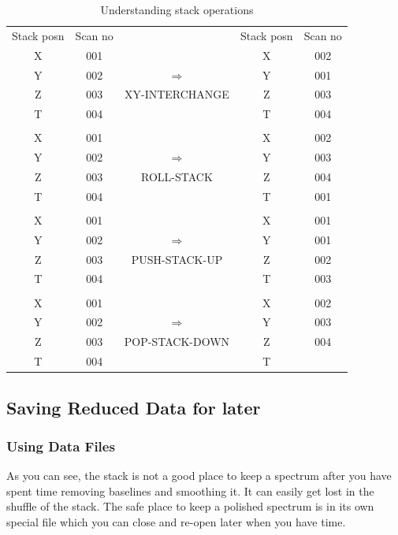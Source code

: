 \documentclass[11pt,twoside]{article}
\begin{document}
\begin{table}[htb]
\caption{Understanding stack operations}
\begin{center}
\begin{tabular}{ccccc}
Stack posn & Scan no &      & Stack posn & Scan no \\ 
X & 001 &                                & X & 002 \\ 
Y & 002 & {\huge $\Longrightarrow$}      & Y & 001 \\
Z & 003 & {\footnotesize XY-INTERCHANGE} & Z & 003 \\
T & 004 &                                & T & 004 \\
  &     &                                &   &     \\
X & 001 &                                & X & 002 \\ 
Y & 002 & {\huge $\Longrightarrow$}      & Y & 003 \\
Z & 003 & {\footnotesize ROLL-STACK}     & Z & 004 \\
T & 004 &                                & T & 001 \\
  &     &                                &   &     \\
X & 001 &                                & X & 001 \\
Y & 002 & {\huge $\Longrightarrow$}      & Y & 001 \\
Z & 003 & {\footnotesize PUSH-STACK-UP}  & Z & 002 \\
T & 004 &                                & T & 003 \\
  &     &                                &   &     \\
X & 001 &                                & X & 002 \\
Y & 002 & {\huge $\Longrightarrow$}      & Y & 003 \\
Z & 003 & {\footnotesize POP-STACK-DOWN} & Z & 004 \\
T & 004 &                                & T &     \\
\end{tabular}
\label{tab:specx_tab1}
\end{center}
\end{table}

\subsection{Saving Reduced Data for later}
\label{sec:specx_7}
\subsubsection{Using Data Files}
\label{sec:data-files}
As you can see, the stack is not a good place to keep a spectrum after
you have spent time removing baselines and smoothing it.  It can
easily get lost in the shuffle of the stack.  The safe place to keep a
polished spectrum is in its own special file which you can close and
re-open later when you have time.
\end{document}
